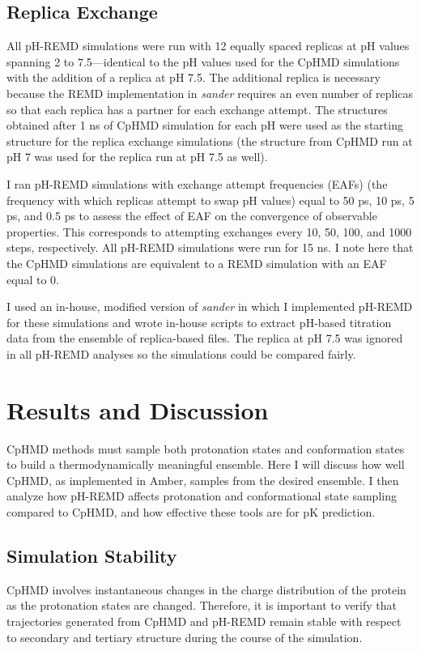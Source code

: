 \subsection{Replica Exchange}

All pH-REMD simulations were run with 12 equally spaced replicas at pH values
spanning 2 to 7.5---identical to the pH values used for the CpHMD simulations
with the addition of a replica at pH 7.5. The additional replica is necessary
because the REMD implementation in \emph{sander} requires an even number of
replicas so that each replica has a partner for each exchange attempt. The
structures obtained after 1 ns of CpHMD simulation for each pH were used as the
starting structure for the replica exchange simulations (the structure from
CpHMD run at pH 7 was used for the replica run at pH 7.5 as well).

I ran pH-REMD simulations with exchange attempt frequencies (EAFs) (\ie the
frequency with which replicas attempt to swap pH values) equal to 50
ps, 10 ps, 5 ps, and 0.5 ps to assess
the effect of EAF on the convergence of observable properties. This corresponds
to attempting exchanges every 10, 50, 100, and 1000 steps, respectively. All
pH-REMD simulations were run for 15 ns. I note here that the CpHMD simulations
are equivalent to a REMD simulation with an EAF equal to 0.

I used an in-house, modified version of \emph{sander} in which I implemented
pH-REMD for these simulations and wrote in-house scripts to extract pH-based
titration data from the ensemble of replica-based files. The replica at pH 7.5
was ignored in all pH-REMD analyses so the simulations could be compared fairly.

\section{Results and Discussion}

CpHMD methods must sample both protonation states and conformation states to
build a thermodynamically meaningful ensemble. Here I will discuss how well
CpHMD, as implemented in Amber, \cite{Mongan_JComputChem_2004_v25_p2038} samples
from the desired ensemble. I then analyze how pH-REMD affects protonation and
conformational state sampling compared to CpHMD, and how effective these tools
are for pK prediction.

\subsection{Simulation Stability}
CpHMD involves instantaneous changes in the charge distribution of the protein
as the protonation states are changed. Therefore, it is important to verify
that trajectories generated from CpHMD and pH-REMD remain stable with respect to
secondary and tertiary structure during the course of the simulation.

